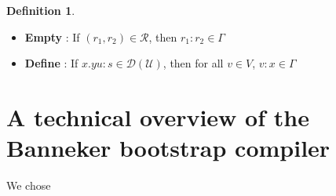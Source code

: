 \documentclass{amsbook}
\DeclareRobustCommand{\#}{\adjustbox{valign=B,totalheight=.57\baselineskip}{\oldhash}}%
\theoremstyle{definition}
\newtheorem{definition}[theorem]{Definition}
\theoremstyle{remark}
\numberwithin{section}{chapter}
\numberwithin{equation}{chapter}
\begin{document}
\begin{definition}
\begin{itemize}
            \begin{itemize}
                \item \textbf{Empty} : If $(r_1,r_2)\in\mathcal{R}$, then $r_1 : r_2 \in \Gamma$
                \item \textbf{Define} : If $x . y u : s \in \mathcal{D}(\mathcal{U})$, then for all $v \in V$, $v : x \in \Gamma$
            \end{itemize}
    \end{itemize}
\end{definition}

\chapter{A technical overview of the Banneker bootstrap compiler}

We chose 

\appendix
% 

\backmatter


\printindex
\end{document}
